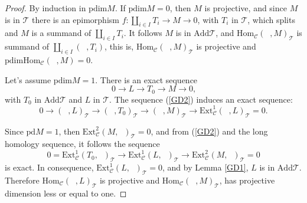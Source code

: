 \documentclass{amsart}
\theoremstyle{plain}
\numberwithin{equation}{section}
\begin{document}
\begin{proof}
By induction in $\mathrm{pdim}M$. If $\mathrm{pdim}M=0$, then $M$ is
projective, and since $M$ is in $\mathscr{T}$ there is an epimorphism $f:\coprod_{i\in I}T_{i}\rightarrow M\rightarrow 0$, with $T_{i}$ in $\mathcal{T}$, which splits and $M$ is a summand of $\coprod_{i\in I}T_{i}$.
It follows $M$ is in $\mathrm{Add}\mathcal{T}$, and $\mathrm{Hom}_{\mathcal{C}}(\;\;,M)_{\mathcal{T}}$ is summand of $\coprod_{i\in I} (\;\;,T_{i})$,
this is, $\mathrm{Hom}_{\mathcal{C}}(\;\;,M)_{\mathcal{T}}$ is projective
and $\mathrm{pdim}\mathrm{Hom}_{\mathcal{C}}(\;\;,M)=0$.

Let's assume $\mathrm{pdim}M=1$. There is an exact sequence
\begin{equation}  \label{GD2}
0\rightarrow L\rightarrow T_{0}\rightarrow M\rightarrow 0\text{,}
\end{equation}with $T_{0}$ in $\mathrm{Add}\mathcal{T}$ and $L$ in $\mathscr{T}$. The
sequence (\ref{GD2}) induces an exact sequence:
\begin{equation*}
0\rightarrow (\;\;,L)_{\mathcal{T}}\rightarrow (\;\;,T_{0})_{\mathcal{T}}\rightarrow (\;\;,M)_{\mathcal{T}}\rightarrow \mathrm{Ext}_{\mathcal{C}}^{1}(\;\;,L)_{\mathcal{T}}=0\text{.}
\end{equation*}

Since $\mathrm{pd}M=1$, then $\mathrm{Ext}_{\mathcal{C}}^{2}(M,\;\;)_{\mathscr{T}}=0$, and from (\ref{GD2}) and the long homology sequence, it
follows the sequence
\begin{equation*}
0=\mathrm{Ext}_{\mathcal{C}}^{1}(T_{0},\;\;)_{\mathscr{T}}\rightarrow
\mathrm{Ext}_{\mathcal{C}}^{1}(L,\;\;)_{\mathscr{T}}\rightarrow \mathrm{Ext}_{\mathcal{C}}^{2}(M,\;\;)_{\mathscr{T}}=0
\end{equation*}is exact. In consequence, $\mathrm{Ext}_{\mathcal{C}}^{1}(L,\;\;)_{\mathscr T}=0$, and by Lemma \ref{GD1}, $L$ is in $\mathrm{Add}\mathcal{T}$.
Therefore $\mathrm{Hom}_{\mathcal{C}}(\;\;,L)_{\mathcal{T}}$ is projective
and $\mathrm{Hom}_{\mathcal{C}}(\;\;,M)_{\mathcal{T}}$, has projective
dimension less or equal to one.


\end{proof}
\end{document}
